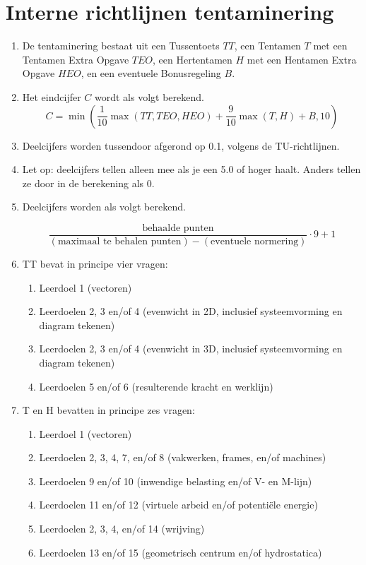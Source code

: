\documentclass{article}
\begin{document}
\section*{Interne richtlijnen tentaminering}
\begin{enumerate}
    \item De tentaminering bestaat uit een Tussentoets $TT$, een Tentamen $T$ met een Tentamen Extra Opgave $TEO$, een Hertentamen $H$ met een Hentamen Extra Opgave $HEO$, en een eventuele Bonusregeling $B$.
    
    \item Het eindcijfer $C$ wordt als volgt berekend.
    $$C = \min\left(\frac{1}{10}\max(TT, TEO, HEO) + \frac{9}{10}\max(T, H) + B, 10\right)$$

    \item Deelcijfers worden tussendoor afgerond op 0.1, volgens de TU-richtlijnen.

    \item Let op: deelcijfers tellen alleen mee als je een 5.0 of hoger haalt. Anders tellen ze door in de berekening als 0.

    \item Deelcijfers worden als volgt berekend.

    $$\frac{\text{behaalde punten}}{(\text{maximaal te behalen punten}) - (\text{eventuele normering})}\cdot9+1$$

    \item TT bevat in principe vier vragen: 
    \begin{enumerate}
        \item Leerdoel 1 (vectoren)
        \item Leerdoelen 2, 3 en/of 4 (evenwicht in 2D, inclusief systeemvorming en diagram tekenen)
        \item Leerdoelen 2, 3 en/of 4 (evenwicht in 3D, inclusief systeemvorming en diagram tekenen)
        \item Leerdoelen 5 en/of 6 (resulterende kracht en werklijn)
    \end{enumerate}

    \item T en H bevatten in principe zes vragen:
    \begin{enumerate}
        \item Leerdoel 1 (vectoren)
        \item Leerdoelen 2, 3, 4, 7, en/of 8 (vakwerken, frames, en/of machines)
        \item Leerdoelen 9 en/of 10 (inwendige belasting en/of V- en M-lijn)
        \item Leerdoelen 11 en/of 12 (virtuele arbeid en/of potentiële energie)
        \item Leerdoelen 2, 3, 4, en/of 14 (wrijving)
        \item Leerdoelen 13 en/of 15 (geometrisch centrum en/of hydrostatica)
    \end{enumerate}
    

\end{enumerate}
\end{document}
